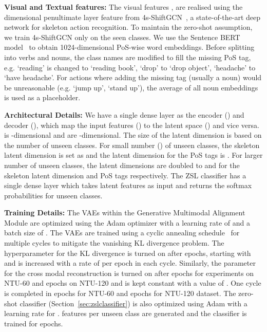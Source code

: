 \documentclass{article}
\begin{document}
\noindent \textbf{Visual and Textual features:} The visual features , are realised using the  dimensional penultimate layer feature from 4s-ShiftGCN~\cite{cheng2020skeleton}, a state-of-the-art deep network for skeleton action recognition. To maintain the zero-shot assumption, we train 4s-ShiftGCN only on the seen classes. We use the Sentence BERT model~\cite{reimers2019sentence} to obtain 1024-dimensional PoS-wise word embeddings. Before splitting into verbs and nouns, the class names are modified to fill the missing PoS tag, e.g. `reading' is changed to `reading book', `drop' to `drop object', `headache' to `have headache'. For actions where adding the missing tag (usually a noun) would be unreasonable (e.g. `jump up', `stand up'), the average of all noun embeddings is used as a placeholder. 


\noindent \textbf{Architectural Details:} We have a single dense layer as the encoder () and decoder (), which map the input features () to the latent space () and vice versa.  is -dimensional and  are -dimensional. The size of the latent dimension is based on the number of unseen classes. For small number () of unseen classes, the skeleton latent dimension is set as  and the latent dimension for the PoS tags is . For larger number of unseen classes, the latent dimensions are doubled to  and  for the skeleton latent dimension and PoS tags respectively. The ZSL classifier has a single dense layer which takes latent features as input and returns the softmax probabilities for unseen classes. 

\noindent \textbf{Training Details:} The VAEs within the Generative Multimodal Alignment Module are optimized using the Adam optimizer with a learning rate of  and a batch size of . The VAEs are trained using a cyclic annealing schedule~\cite{fu2019cyclical} for multiple cycles to mitigate the vanishing KL divergence problem. The  hyperparameter for the KL divergence is turned on after  epochs, starting with  and is increased with a rate of  per epoch in each cycle. Similarly, the  parameter for the cross modal reconstruction is turned on after  epochs for experiments on NTU-60 and  epochs on NTU-120 and is kept constant with a value of . One cycle is completed in  epochs for NTU-60 and  epochs for NTU-120 dataset. The zero-shot classifier (Section~\ref{sec:zslclassifier}) is also optimized using Adam with a learning rate for .  features per unseen class are generated and the classifier is trained for  epochs.
\end{document}

